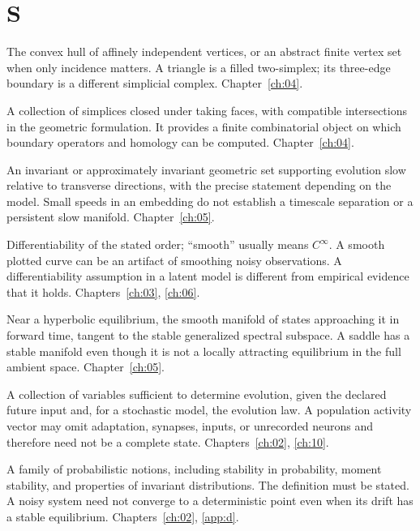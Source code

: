 \section*{S}
\begin{description}[style=nextline]
\item[Simplex.] The convex hull of affinely independent vertices, or an abstract finite vertex set when only incidence matters. A triangle is a filled two-simplex; its three-edge boundary is a different simplicial complex. Chapter~\ref{ch:04}.
\item[Simplicial complex.] A collection of simplices closed under taking faces, with compatible intersections in the geometric formulation. It provides a finite combinatorial object on which boundary operators and homology can be computed. Chapter~\ref{ch:04}.
\item[Slow manifold.] An invariant or approximately invariant geometric set supporting evolution slow relative to transverse directions, with the precise statement depending on the model. Small speeds in an embedding do not establish a timescale separation or a persistent slow manifold. Chapter~\ref{ch:05}.
\item[Smoothness.] Differentiability of the stated order; ``smooth'' usually means $C^\infty$. A smooth plotted curve can be an artifact of smoothing noisy observations. A differentiability assumption in a latent model is different from empirical evidence that it holds. Chapters~\ref{ch:03}, \ref{ch:06}.
\item[Stable manifold.] Near a hyperbolic equilibrium, the smooth manifold of states approaching it in forward time, tangent to the stable generalized spectral subspace. A saddle has a stable manifold even though it is not a locally attracting equilibrium in the full ambient space. Chapter~\ref{ch:05}.
\item[State.] A collection of variables sufficient to determine evolution, given the declared future input and, for a stochastic model, the evolution law. A population activity vector may omit adaptation, synapses, inputs, or unrecorded neurons and therefore need not be a complete state. Chapters~\ref{ch:02}, \ref{ch:10}.
\item[Stochastic stability.] A family of probabilistic notions, including stability in probability, moment stability, and properties of invariant distributions. The definition must be stated. A noisy system need not converge to a deterministic point even when its drift has a stable equilibrium. Chapters~\ref{ch:02}, \ref{app:d}.
\end{description}

